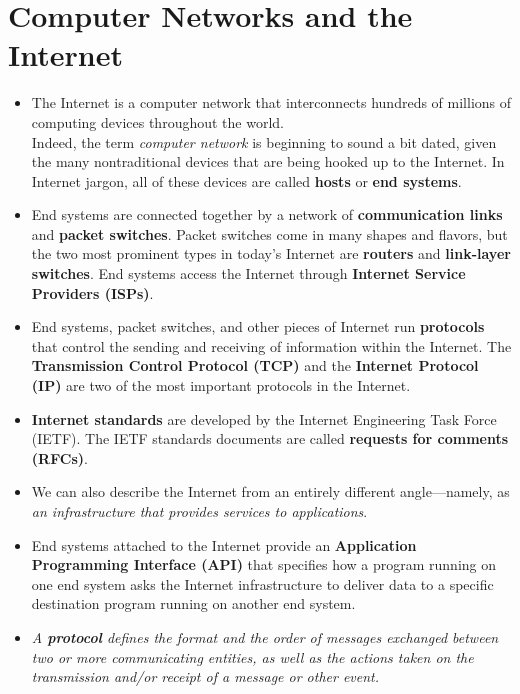 \section{Computer Networks and the Internet}
\begin{itemize}

\item
The Internet is a computer network that interconnects hundreds of millions of computing devices throughout the world.\\
Indeed, the term \textit{computer network} is beginning to sound a bit dated, given the many nontraditional devices that are being hooked up to the Internet. In Internet jargon, all of these devices are called \textbf{hosts} or \textbf{end systems}.

\item
End systems are connected together by a network of \textbf{communication links} and \textbf{packet switches}. Packet switches come in many shapes and flavors, but the two most prominent types in today's Internet are \textbf{routers} and \textbf{link-layer switches}. End systems access the Internet through \textbf{Internet Service Providers (ISPs)}.

\item
End systems, packet switches, and other pieces of Internet run \textbf{protocols} that control the sending and receiving of information within the Internet. The \textbf{Transmission Control Protocol (TCP)} and the \textbf{Internet Protocol (IP)} are two of the most important protocols in the Internet.

\item
\textbf{Internet standards} are developed by the Internet Engineering Task Force (IETF). The IETF standards documents are called \textbf{requests for comments (RFCs)}.

\item
We can also describe the Internet from an entirely different angle---namely, as \textit{an infrastructure that provides services to applications}.

\item
End systems attached to the Internet provide an \textbf{Application Programming Interface (API)} that specifies how a program running on one end system asks the Internet infrastructure to deliver data to a specific destination program running on another end system.

\item
\textit{A \textbf{protocol} defines the format and the order of messages exchanged between two or more communicating entities, as well as the actions taken on the transmission and/or receipt of a message or other event.}


\end{itemize}
